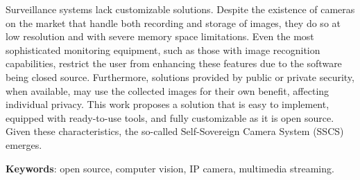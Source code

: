 \documentclass[12pt, %
openright, 
oneside, %
a4paper,    %
brazil]{facom-ufu-abntex2}
\begin{document}
\begin{resumo}[Abstract]

	Surveillance systems lack customizable solutions. Despite the existence
	of cameras on the market that handle both recording and storage of images, they
	do so at low resolution and with severe memory space limitations. Even the most
	sophisticated monitoring equipment, such as those with image recognition
	capabilities, restrict the user from enhancing these features due to the
	software being closed source. Furthermore, solutions provided by public or
	private security, when available, may use the collected images for their own
	benefit, affecting individual privacy. This work proposes a solution that is
	easy to implement, equipped with ready-to-use tools, and fully customizable as
	it is open source. Given these characteristics, the so-called Self-Sovereign
	Camera System (SSCS) emerges.

	\vspace{\onelineskip}
	\noindent
	\textbf{Keywords}: open source, computer vision, IP camera, multimedia
	streaming.
\end{resumo}

\listoffigures*
\cleardoublepage

\listoftables*
\cleardoublepage

\end{document}
